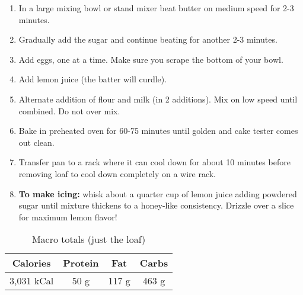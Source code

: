 \documentclass{report}
\begin{document}
\begin{multicols}{2}
\begin{enumerate}
\item In a large mixing bowl or stand mixer beat butter on medium speed for 2-3 minutes.
\medskip 
\item Gradually add the sugar and continue beating for another 2-3 minutes.
\medskip 
\item Add eggs, one at a time. Make sure you scrape the bottom of your bowl.
\medskip
\item Add lemon juice (the batter will curdle).
\medskip
\item Alternate addition of flour and milk (in 2 additions). Mix on low speed until combined. Do not over mix.
\medskip
\item Bake in preheated oven for 60-75 minutes until golden and cake tester comes out clean.
\medskip
\item Transfer pan to a rack where it can cool down for about 10 minutes before removing loaf to cool down completely on a wire rack.
\medskip \item \textbf{To make icing:} whisk about a quarter cup of lemon juice adding powdered sugar until mixture thickens to a honey-like consistency. Drizzle over a slice for maximum lemon flavor! 
\end{enumerate}
\begin{table}[H]
  \begin{center}
    \caption{Macro totals (just the loaf)}
    \label{tab:table1}
    \begin{tabular}{c|c|c|c} %
      \textbf{Calories} & \textbf{Protein} & \textbf{Fat} & \textbf{Carbs}\\
      \hline
      3,031 kCal & 50 g & 117 g & 463 g\\
    \end{tabular}
  \end{center}
\end{table}
\end{multicols}



\end{document}

